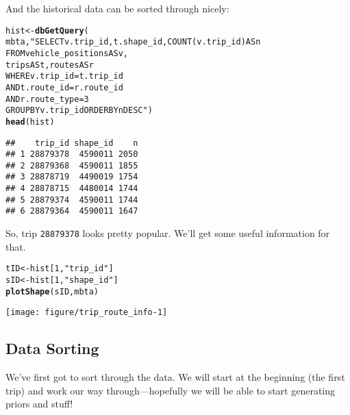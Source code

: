 \documentclass[11pt]{article}\usepackage[]{graphicx}\usepackage[]{color}
\makeatletter
\def\maxwidth{ %
  \ifdim\Gin@nat@width>\linewidth
    \linewidth
  \else
    \Gin@nat@width
  \fi
}
\newcommand{\hlnum}[1]{\textcolor[rgb]{0.686,0.059,0.569}{#1}}%
\newcommand{\hlstr}[1]{\textcolor[rgb]{0.192,0.494,0.8}{#1}}%
\newcommand{\hlstd}[1]{\textcolor[rgb]{0.345,0.345,0.345}{#1}}%
\newcommand{\hlkwb}[1]{\textcolor[rgb]{0.69,0.353,0.396}{#1}}%
\newcommand{\hlkwd}[1]{\textcolor[rgb]{0.737,0.353,0.396}{\textbf{#1}}}%
\newenvironment{kframe}{%
 \def\at@end@of@kframe{}%
 \ifinner\ifhmode%
  \def\at@end@of@kframe{\end{minipage}}%
  \begin{minipage}{\columnwidth}%
 \fi\fi%
 \def\FrameCommand##1{\hskip\@totalleftmargin \hskip-\fboxsep
 \colorbox{shadecolor}{##1}\hskip-\fboxsep
     \hskip-\linewidth \hskip-\@totalleftmargin \hskip\columnwidth}%
 \MakeFramed {\advance\hsize-\width
   \@totalleftmargin\z@ \linewidth\hsize
   \@setminipage}}%
 {\par\unskip\endMakeFramed%
 \at@end@of@kframe}
\newenvironment{knitrout}{}{} %
\makeatother
\begin{document}
And the historical data can be sorted through nicely:
\begin{knitrout}
\color{fgcolor}\begin{kframe}
\begin{alltt}
\hlstd{hist} \hlkwb{<-} \hlkwd{dbGetQuery}\hlstd{(}
    \hlstd{mbta,} \hlstr{"SELECT v.trip_id, t.shape_id, COUNT(v.trip_id) AS n
           FROM vehicle_positions AS v, 
                trips AS t, routes AS r
           WHERE v.trip_id=t.trip_id
             AND t.route_id=r.route_id
             AND r.route_type=3
           GROUP BY v.trip_id ORDER BY n DESC"}\hlstd{)}
\hlkwd{head}\hlstd{(hist)}
\end{alltt}
\begin{verbatim}
##    trip_id shape_id    n
## 1 28879378  4590011 2050
## 2 28879368  4590011 1855
## 3 28878719  4490019 1754
## 4 28878715  4480014 1744
## 5 28879374  4590011 1744
## 6 28879364  4590011 1647
\end{verbatim}
\end{kframe}
\end{knitrout}

So, trip \verb+28879378+ looks pretty popular. We'll get some useful information for that.
\begin{knitrout}
\color{fgcolor}\begin{kframe}
\begin{alltt}
\hlstd{tID} \hlkwb{<-} \hlstd{hist[}\hlnum{1}\hlstd{,} \hlstr{"trip_id"}\hlstd{]}
\hlstd{sID} \hlkwb{<-} \hlstd{hist[}\hlnum{1}\hlstd{,} \hlstr{"shape_id"}\hlstd{]}
\hlkwd{plotShape}\hlstd{(sID, mbta)}
\end{alltt}
\end{kframe}

{\centering \texttt{[image: figure/trip\_route\_info-1]} 

}



\end{knitrout}


\subsection{Data Sorting}

We've first got to sort through the data. We will start at the beginning (the first trip) and work
our way through---hopefully we will be able to start generating priors and stuff!
\end{document}
